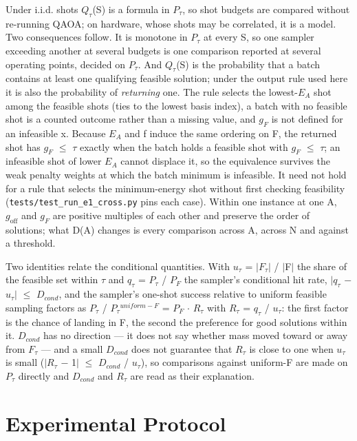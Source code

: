 \documentclass{ieeeaccess}
\begin{document}
Under i.i.d. shots $Q_{\tau}$(S) is a formula in $P_{\tau}$, so shot budgets are compared without re-running QAOA; on hardware, whose shots may be correlated, it is a model. Two consequences follow. It is monotone in $P_{\tau}$ at every S, so one sampler exceeding another at several budgets is one comparison reported at several operating points, decided on $P_{\tau}$. And $Q_{\tau}$(S) is the probability that a batch contains at least one qualifying feasible solution; under the output rule used here it is also the probability of \textit{returning} one. The rule selects the lowest-$E_{A}$ shot among the feasible shots (ties to the lowest basis index), a batch with no feasible shot is a counted outcome rather than a missing value, and $g_{F}$ is not defined for an infeasible x. Because $E_{A}$ and f induce the same ordering on F, the returned shot has $g_{F}$ $\leq$ $\tau$ exactly when the batch holds a feasible shot with $g_{F}$ $\leq$ $\tau$; an infeasible shot of lower $E_{A}$ cannot displace it, so the equivalence survives the weak penalty weights at which the batch minimum is infeasible. It need not hold for a rule that selects the minimum-energy shot without first checking feasibility (\texttt{tests/test\_run\_e1\_cross.py} pins each case). Within one instance at one A, $g_{\mathrm{off}}$ and $g_{F}$ are positive multiples of each other and preserve the order of solutions; what D(A) changes is every comparison across A, across N and against a threshold.


Two identities relate the conditional quantities. With $u_{\tau}$ = $|$$F_{\tau}$$|$ / $|$F$|$ the share of the feasible set within $\tau$ and $q_{\tau}$ = $P_{\tau}$ / $P_{F}$ the sampler's conditional hit rate, $|$$q_{\tau}$ $-$ $u_{\tau}$$|$ $\leq$ $D_{cond}$, and the sampler's one-shot success relative to uniform feasible sampling factors as $P_{\tau}$ / $P_{\tau}$$^{uniform-F}$ = $P_{F}$ $\cdot$ $R_{\tau}$ with $R_{\tau}$ = $q_{\tau}$ / $u_{\tau}$: the first factor is the chance of landing in F, the second the preference for good solutions within it. $D_{cond}$ has no direction --- it does not say whether mass moved toward or away from $F_{\tau}$ --- and a small $D_{cond}$ does not guarantee that $R_{\tau}$ is close to one when $u_{\tau}$ is small ($|$$R_{\tau}$ $-$ 1$|$ $\leq$ $D_{cond}$ / $u_{\tau}$), so comparisons against uniform-F are made on $P_{\tau}$ directly and $D_{cond}$ and $R_{\tau}$ are read as their explanation.


\section{Experimental Protocol}
\end{document}
